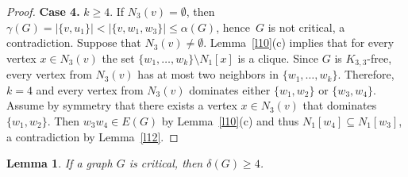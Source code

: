 \documentclass[12pt]{article}
\newtheorem{lemma}{Lemma}
\begin{document}
\begin{proof}
\textbf{Case 4.} $k \geq 4$. If $N_3(v) = \emptyset$, then $\gamma(G) = |\{v,u_1\}| < |\{v,w_1,w_3\}| \leq \alpha(G)$, hence~$G$ is not critical, a contradiction. Suppose that $N_3(v) \neq \emptyset$. Lemma~\ref{l10}(c) implies that for every vertex $x \in N_3(v)$ the set $\{w_1,\ldots,w_k\} \setminus N_1[x]$ is a clique. Since $G$ is $K_{3,3}$-free, every vertex from $N_3(v)$ has at most two neighbors in $\{w_1,\ldots,w_k\}$. Therefore, $k = 4$ and every vertex from $N_3(v)$  dominates either $\{w_1,w_2\}$ or $\{w_3,w_4\}$. Assume by symmetry that there exists a vertex $x \in N_3(v)$ that dominates $\{w_1,w_2\}$. Then $w_3w_4 \in E(G)$ by Lemma~\ref{l10}(c) and thus $N_1[w_4] \subseteq N_1[w_3]$, a contradiction by Lemma~\ref{l12}.

\end{proof}

\begin{lemma}\label{l19}
If a graph $G$ is critical, then $\delta(G) \geq 4$.
\end{lemma}
\end{document}
